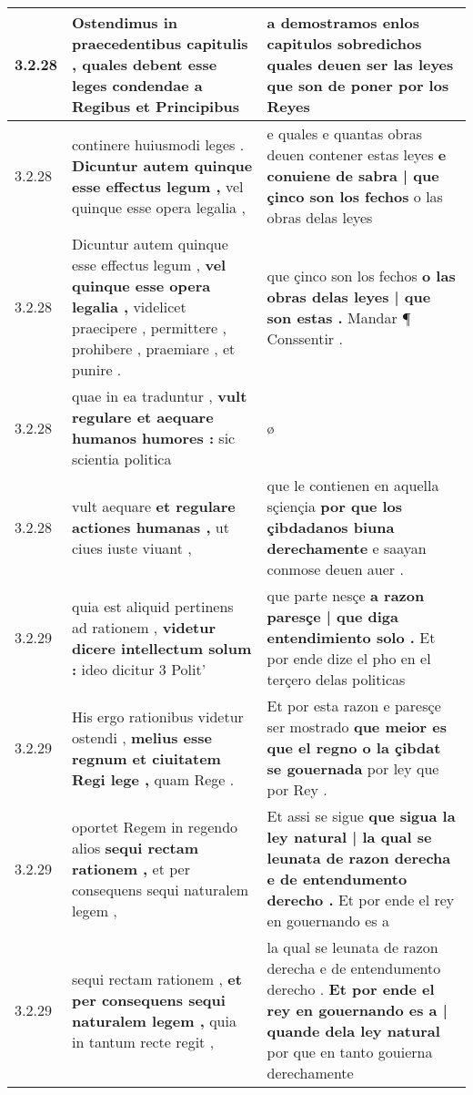 \begin{tabular}{|p{1cm}|p{6.5cm}|p{6.5cm}|}
3.2.28 & Ostendimus in praecedentibus capitulis , \textbf{ quales debent esse leges condendae } a Regibus et Principibus & a demostramos enlos capitulos sobredichos quales deuen ser las leyes \textbf{ que son de poner } por los Reyes \\\hline
3.2.28 & continere huiusmodi leges . \textbf{ Dicuntur autem quinque esse effectus legum , } vel quinque esse opera legalia , & e quales e quantas obras deuen contener estas leyes \textbf{ e conuiene de sabra | que çinco son los fechos } o las obras delas leyes \\\hline
3.2.28 & Dicuntur autem quinque esse effectus legum , \textbf{ vel quinque esse opera legalia , } videlicet praecipere , permittere , prohibere , praemiare , et punire . & que çinco son los fechos \textbf{ o las obras delas leyes | que son estas . } Mandar ¶ Conssentir . \\\hline
3.2.28 & quae in ea traduntur , \textbf{ vult regulare et aequare humanos humores : } sic scientia politica & ø \\\hline
3.2.28 & vult aequare \textbf{ et regulare actiones humanas , } ut ciues iuste viuant , & que le contienen en aquella sçiençia \textbf{ por que los çibdadanos biuna derechamente } e saayan conmose deuen auer . \\\hline
3.2.29 & quia est aliquid pertinens ad rationem , \textbf{ videtur dicere intellectum solum : } ideo dicitur 3 Polit’ & que parte nesçe \textbf{ a razon paresçe | que diga entendimiento solo . } Et por ende dize el pho en el terçero delas politicas \\\hline
3.2.29 & His ergo rationibus videtur ostendi , \textbf{ melius esse regnum et ciuitatem Regi lege , } quam Rege . & Et por esta razon e paresçe ser mostrado \textbf{ que meior es que el regno o la çibdat se gouernada } por ley que por Rey . \\\hline
3.2.29 & oportet Regem in regendo alios \textbf{ sequi rectam rationem , } et per consequens sequi naturalem legem , & Et assi se sigue \textbf{ que sigua la ley natural | la qual se leunata de razon derecha e de entendumento derecho . } Et por ende el rey en gouernando es a \\\hline
3.2.29 & sequi rectam rationem , \textbf{ et per consequens sequi naturalem legem , } quia in tantum recte regit , & la qual se leunata de razon derecha e de entendumento derecho . \textbf{ Et por ende el rey en gouernando es a | quande dela ley natural } por que en tanto gouierna derechamente \\\hline

\end{tabular}
